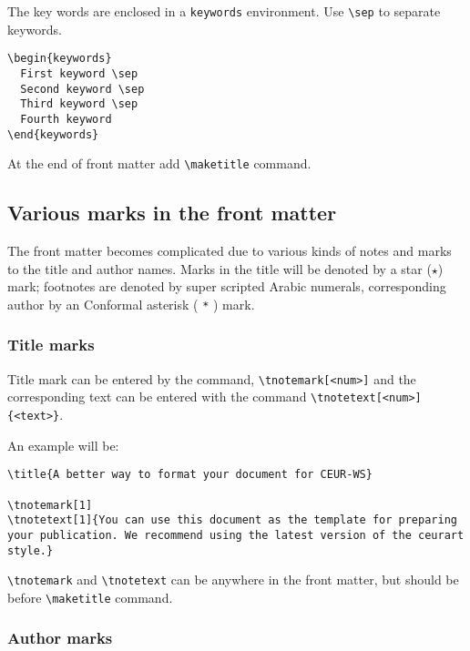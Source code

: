 \documentclass[%
twocolumn
]{ceurart}
\begin{document}
The key words are enclosed in a
\verb|keywords|
environment. Use
\verb|\sep|
 to separate keywords.

\begin{lstlisting}[language={[latex]TeX}]
\begin{keywords}
  First keyword \sep
  Second keyword \sep
  Third keyword \sep
  Fourth keyword
\end{keywords}
\end{lstlisting}

At the end of front matter add
\verb|\maketitle|
 command.

\subsection{Various marks in the front matter}

The front matter becomes complicated due to various kinds of notes and marks to the title and author names.
Marks in the title will be denoted by a star ($\star$) mark; footnotes are denoted by super scripted Arabic numerals, corresponding author by an Conformal asterisk (
\verb|*|
) mark.

\subsubsection{Title marks}

Title mark can be entered by the command,
\verb|\tnotemark[<num>]|
and the corresponding text can be entered with the command
\verb|\tnotetext[<num>]{<text>}|.

An example will be:
\begin{lstlisting}[language={[latex]TeX}]
\title{A better way to format your document for CEUR-WS}

\tnotemark[1]
\tnotetext[1]{You can use this document as the template for preparing your publication. We recommend using the latest version of the ceurart style.}
\end{lstlisting}

\verb|\tnotemark|
 and
\verb|\tnotetext|
 can be anywhere in the front matter, but should be before
\verb|\maketitle|
 command.

\subsubsection{Author marks}
\end{document}
